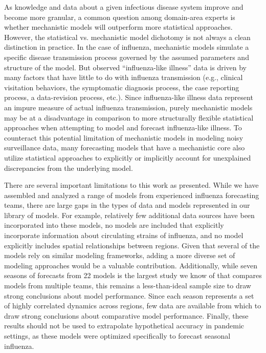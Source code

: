 \documentclass[9pt,twocolumn,twoside]{pnas-new}\usepackage[]{graphicx}\usepackage[]{color}
\begin{document}
As knowledge and data about a given infectious disease system improve and become more granular, a common question among domain-area experts is whether mechanistic models will outperform more statistical approaches.
However, the statistical vs. mechanistic model dichotomy is not always a clean distinction in practice.
In the case of influenza, mechanistic models simulate a specific disease transmission process governed by the assumed parameters and structure of the model. 
But observed ``influenza-like illness'' data is driven by many factors that have little to do with influenza transmission (e.g., clinical visitation behaviors, the symptomatic diagnosis process, the case reporting process, a data-revision process, etc.). 
Since influenza-like illness data represent an impure measure of actual influenza transmission, purely mechanistic models may be at a disadvantage in comparison to more structurally flexible statistical approaches when attempting to model and forecast influenza-like illness.
To counteract this potential limitation of mechanistic models in modeling noisy surveillance data, many forecasting models that have a mechanistic core also utilize statistical approaches to explicitly or implicitly account for unexplained discrepancies from the underlying model.\cite{Pei2017,osthus2018dynamic}

There are several important limitations to this work as presented.
While we have assembled and analyzed a range of models from experienced influenza forecasting teams, there are large gaps in the types of data and models represented in our library of models.
For example, relatively few additional data sources have been incorporated into these models, no models are included that explicitly incorporate information about circulating strains of influenza, and no model explicitly includes spatial relationships between regions.
Given that several of the models rely on similar modeling frameworks, adding a more diverse set of modeling approaches would be a valuable contribution.
Additionally, while seven seasons of forecasts from 22 models is the largest study we know of that compares models from multiple teams, this remains a less-than-ideal sample size to draw strong conclusions about model performance. 
Since each season represents a set of highly correlated dynamics across regions, few data are available from which to draw strong conclusions about comparative model performance.
Finally, these results should not be used to extrapolate hypothetical accuracy in pandemic settings, as these models were optimized specifically to forecast seasonal influenza.
\end{document}
